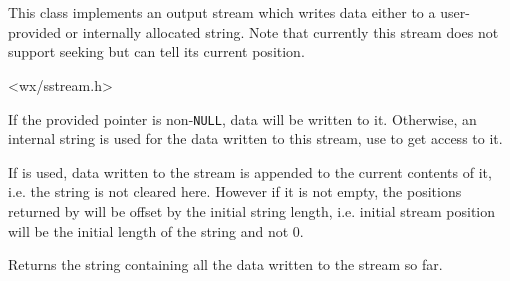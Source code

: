 
\section{}\label{wxstringoutputstream}

This class implements an output stream which writes data either to a
user-provided or internally allocated string. Note that currently this stream
does not support seeking but can tell its current position.




<wx/sstream.h>



\label{wxstringoutputstreamctor}


If the provided pointer is non-\texttt{NULL}, data will be written to it.
Otherwise, an internal string is used for the data written to this stream, use 
 to get access to it.

If  is used, data written to the stream is appended to the current
contents of it, i.e. the string is not cleared here. However if it is not
empty, the positions returned by  will be
offset by the initial string length, i.e. initial stream position will be the
initial length of the string and not $0$.


\label{wxstringoutputstreamgetstring}


Returns the string containing all the data written to the stream so far.

